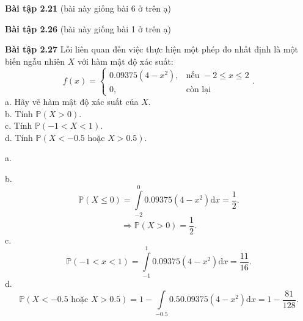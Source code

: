 \documentclass[12pt,a4paper]{article}
\begin{document}
\begin{mybox}
    \textbf{Bài tập 2.21} (bài này giống bài 6 ở trên ạ)
\end{mybox}

\begin{mybox}
    \textbf{Bài tập 2.26} (bài này giống bài 1 ở trên ạ)
\end{mybox}

\begin{mybox}
    \textbf{Bài tập 2.27} Lỗi liên quan đến việc thực hiện một phép đo nhất định là một biến ngẫu nhiên $X$ với hàm mật độ xác suất:
    $$f \left( x \right) = 
    \begin{cases}
        0.09375 \left( {4 - x^2}\right), &\text{nếu } -2 \leqslant x \leqslant 2\\
        0, &\text{còn lại}
    \end{cases}
    .$$
    a. Hãy vẽ hàm mật độ xác suất của $X.$\\
    b. Tính $\mathbb{P} \left( {X > 0} \right).$\\
    c. Tính $\mathbb{P} \left( {-1 < X < 1} \right).$\\
    d. Tính $\mathbb{P} \left( {X < -0.5 \text{ hoặc } X > 0.5} \right).$
\end{mybox}
a. \begin{center}
\end{center}
b. $$\mathbb{P} \left( {X \leqslant 0} \right) = \int\limits_{-2}^{0}{0.09375 \left( {4 - x^2} \right) \mathrm{d}x} = \frac{1}{2}.$$
$$\Rightarrow \mathbb{P} \left( {X > 0} \right) = \frac{1}{2}.$$
c. $$\mathbb{P} \left( {-1 < x < 1} \right) = \int\limits_{-1}^{1}{0.09375 \left( {4 - x^2} \right) \mathrm{d}x} = \frac{11}{16}.$$
d. $$\mathbb{P} \left( {X < -0.5 \text{ hoặc } X > 0.5} \right) = 1 - \int\limits_{-0.5}{0.5}{0.09375 \left( {4 - x^2} \right) \mathrm{d}x} = 1 - \frac{81}{128}.$$
\end{document}
